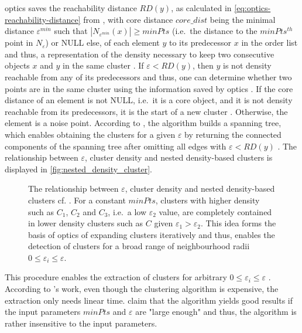 \ac{optics} saves the reachability distance $RD(y)$, as calculated in \autoref{eq:optics-reachability-distance} from \cite{OPTICS2013},
with core distance $core\_dist$ being the minimal distance $\varepsilon^{min}$ such that $| N_{\varepsilon^{min}} (x) | \geq minPts$ 
(i.e.\ the distance to the $minPts^{th}$ point in $N_\varepsilon$) or NULL else, 
of each element $y$ to its predecessor $x$ in the order list and thus, 
a representation of the density necessary to keep two consecutive objects $x$ and $y$ in the same cluster \cite{OPTICS2013}.
If $\varepsilon < RD(y)$, then $y$ is not density reachable from any of its predecessors and thus, 
one can determine whether two points are in the same cluster using the information saved by \ac{optics} \cite{OPTICS2013, OPTICS1999}.
If the core distance of an element is not NULL, i.e.\ it is a core object, and it is not density reachable from its predecessors, 
it is the start of a new cluster \cite{OPTICS1999}.
Otherwise, the element is a noise point.
According to \citeauthor{OPTICS2013}, the algorithm builds a spanning tree, which enables obtaining the clusters for a given $\varepsilon$ by returning the connected components 
of the spanning tree after omitting all edges with $\varepsilon < RD(y)$ \cite{OPTICS2013}.
The relationship between $\varepsilon$, cluster density and nested density-based clusters is displayed in \autoref{fig:nested_density_cluster}.

\begin{figure}[!htp] %
    \centering
    
    \caption[Relationship between $\varepsilon$, cluster density and nested density-based clusters]
    {The relationship between $\varepsilon$, cluster density and nested density-based clusters cf. \cite{OPTICS1999}.
    For a constant $minPts$, clusters with higher density such as $C_1$, $C_2$ and $C_3$, i.e.\ a low $\varepsilon_2$ value, 
    are completely contained in lower density clusters such as $C$ given $\varepsilon_1 > \varepsilon_2$.
    This idea forms the basis of \ac{optics} of expanding clusters iteratively and thus, 
    enables the detection of clusters for a broad range of neighbourhood radii $0 \le \varepsilon_i \le \varepsilon$.
    }
    \label{fig:nested_density_cluster}
\end{figure}

This procedure enables the extraction of clusters for arbitrary $0 \le \varepsilon_i \le \varepsilon$ \cite{OPTICS_kMeans_2016, OPTICS1999}.
According to \citeauthor{OPTICS2013}'s work, even though the clustering algorithm is expensive, the extraction only needs linear time.
\citeauthor{OPTICS1999} claim that the algorithm yields good results if the input parameters $minPts$ and $\varepsilon$ are "large enough" and thus, 
the algorithm is rather insensitive to the input parameters.

